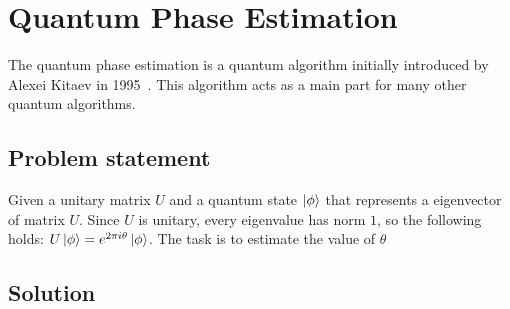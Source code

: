 \section{Quantum Phase Estimation}

The quantum phase estimation is a quantum algorithm initially introduced by Alexei Kitaev in 1995~\cite{QPE}.
This algorithm acts as a main part for many other quantum algorithms.

\subsection{Problem statement}

Given a unitary matrix $U$ and a quantum state $\ket{\phi}$ that represents a eigenvector of matrix $U$.
Since $U$ is unitary, every eigenvalue has norm $1$, so the following holds: $U\ket{\phi} = e^{2\pi i \theta}\ket{\phi}$.
The task is to estimate the value of $\theta$

\subsection{Solution}

